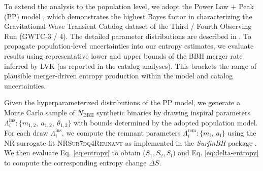 \documentclass[twocolumn]{aastex631}
\begin{document}
To extend the analysis to the population level, we adopt the Power Law + Peak (PP) model \citep{Talbot_2018}, which demonstrates the highest Bayes factor in characterizing the Gravitational-Wave Transient Catalog dataset of the Third / Fourth Observing Run (GWTC-3 / 4). The detailed parameter distributions are described in \cite{gwtc-3-pop, gwtc4pop}. To propagate population-level uncertainties into our entropy estimates, we evaluate results using representative lower and upper bounds of the BBH merger rate inferred by LVK (as reported in the catalog analyses). This brackets the range of plausible merger-driven entropy production within the model and catalog uncertainties.

Given the hyperparameterized distributions of the PP model, we generate a Monte Carlo sample of $N_\mathrm{BBH}$ synthetic binaries by drawing inspiral parameters $\Lambda^\mathrm{ins}_i: \{ m_{1,2},~a_{1,2},~\theta_{1,2} \}$ with bounds determined by the adopted population model. For each draw $\Lambda^\mathrm{ins}_i$, we compute the remnant parameters $\Lambda^\mathrm{rem}_i: \{ m_\mathrm{f},~a_\mathrm{f} \}$ using the NR surrogate fit \textsc{NRSur7dq4Remnant} \citep{Blackman_2017, Boschini_2023} as implemented in the \textit{SurfinBH} package \citep{soft09007V, Varma_2019, zertuche2024highprecisionringdownsurrogatemodel}. We then evaluate Eq. \ref{eq:entropy} to obtain ($S_1, S_2, S_\mathrm{f}$) and Eq. \ref{eq:delta-entropy} to compute the corresponding entropy change $\Delta S$.



\end{document}
